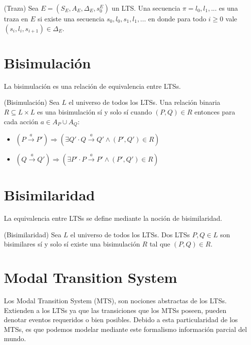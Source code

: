 \begin{definition}{(Traza)}
Sea $E = (S_{E}, A_{E}, \Delta_{E}, s_{0}^{E})$ un LTS. Una secuencia $\pi = l_{0}, l_{1}, ...$ es una traza en $E$ si existe una
secuencia $s_{0}, l_{0}, s_{1}, l_{1}, ...$ en donde para todo $i \geq 0$ vale $(s_{i}, l_{i}, s_{i + 1}) \in \Delta_{E}$.
\end{definition}

\section{Bisimulación}

La bisimulación es una relación de equivalencia entre LTSs.

\begin{definition}{(Bisimulación)}
Sea $L$ el universo de todos los LTSs. Una relación binaria $R \subseteq L \times L$ es una bisimulación sí y solo sí cuando 
$(P, Q) \in R$ entonces para cada acción $a \in A_{P} \cup A_{Q}$:

\begin{itemize}

\item
$(P \xrightarrow{a} P') \Rightarrow (\exists Q' \cdot Q \xrightarrow{a} Q' \land (P', Q') \in R)$

\item
$(Q \xrightarrow{a} Q') \Rightarrow (\exists P' \cdot P \xrightarrow{a} P' \land (P', Q') \in R)$

\end{itemize}

\end{definition}


\section{Bisimilaridad}

La equivalencia entre LTSs se define mediante la noción de bisimilaridad.

\begin{definition}{(Bisimilaridad)}
Sea $L$ el universo de todos los LTSs. Dos LTSs $P, Q \in L$ son bisimilares sí y solo sí existe una bisimulación $R$ tal que $(P, Q) \in R$.

\end{definition}

\section{Modal Transition System}
Los Modal Transition System \cite{MTS} (MTS), son nociones abstractas de los LTSs. Extienden a los LTSs ya que las transiciones 
que los MTSs poseen, pueden denotar eventos requeridos o bien posibles. Debido a esta particularidad de los MTSs, es 
que podemos modelar mediante este formalismo información parcial del mundo.


